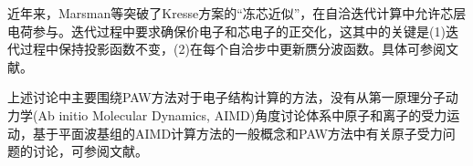 近年来，\textrm{Marsman}等突破了\textrm{Kresse}方案的“冻芯近似”，在自洽迭代计算中允许芯层电荷参与。迭代过程中要求确保价电子和芯电子的正交化，这其中的关键是(1)迭代过程中保持投影函数不变，(2)在每个自洽步中更新赝分波函数。具体可参阅文献\cite{JCP125-104101_2006}。

上述讨论中主要围绕\textrm{PAW}方法对于电子结构计算的方法，没有从第一原理分子动力学\textrm{(Ab initio Molecular Dynamics, AIMD)}角度讨论体系中原子和离子的受力运动，基于平面波基组的\textrm{AIMD}计算方法的一般概念和\textrm{PAW}方法中有关原子受力问题的讨论，可参阅文献\cite{PRB47-10142_1993,PRB50-17953_1994,PRB59-1758_1999,Comput-Phys}。

